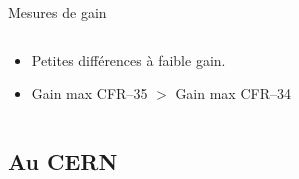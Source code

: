 \begin{frame}{Mesures de gain}
\begin{scriptsize}
\begin{columns}
\begin{column}{0.58\textwidth}
\begin{itemize}
    					\item Petites différences à faible gain.
    					\item  Gain max CFR--35 $>$ Gain max CFR--34
    				\end{itemize}
    			\end{column}
    		\end{columns}
    	\end{scriptsize}
    \end{frame}
    
    \subsection{Au CERN}

    {
    	\setlength\pdfpagewidth{12.8cm}%
    	\setlength\pdfpageheight{9cm}%
    	\begin{frame}[plain]
    	\end{frame}
    }

